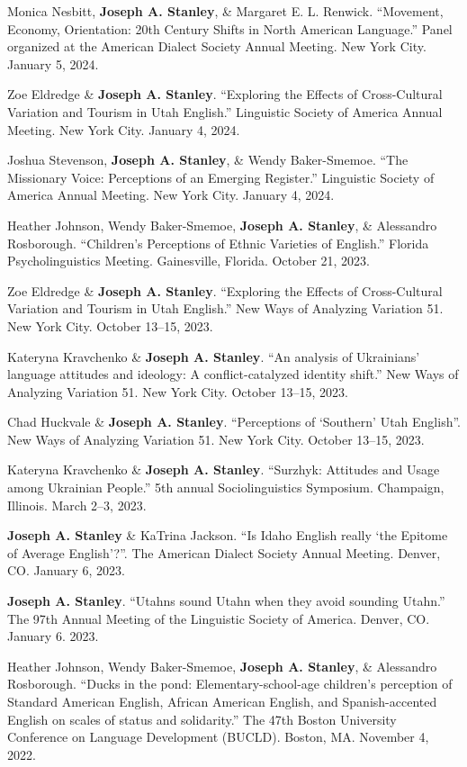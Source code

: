 \documentclass[
]{article}
\begin{document}
Monica Nesbitt, \textbf{Joseph A. Stanley}, \& Margaret E. L. Renwick.
``Movement, Economy, Orientation: 20th Century Shifts in North American
Language.'' Panel organized at the American Dialect Society Annual
Meeting. New York City. January 5, 2024.

{Zoe Eldredge} \& \textbf{Joseph A. Stanley}. ``Exploring the Effects of
Cross-Cultural Variation and Tourism in Utah English.'' Linguistic
Society of America Annual Meeting. New York City. January 4, 2024.

{Joshua Stevenson}, \textbf{Joseph A. Stanley}, \& Wendy Baker-Smemoe.
``The Missionary Voice: Perceptions of an Emerging Register.''
Linguistic Society of America Annual Meeting. New York City. January 4,
2024.

{Heather Johnson}, Wendy Baker-Smemoe, \textbf{Joseph A. Stanley}, \&
Alessandro Rosborough. ``Children's Perceptions of Ethnic Varieties of
English.'' Florida Psycholinguistics Meeting. Gainesville, Florida.
October 21, 2023.

{Zoe Eldredge} \& \textbf{Joseph A. Stanley}. ``Exploring the Effects of
Cross-Cultural Variation and Tourism in Utah English.'' New Ways of
Analyzing Variation 51. New York City. October 13--15, 2023.

{Kateryna Kravchenko} \& \textbf{Joseph A. Stanley}. ``An analysis of
Ukrainians' language attitudes and ideology: A conflict-catalyzed
identity shift.'' New Ways of Analyzing Variation 51. New York City.
October 13--15, 2023.

{Chad Huckvale} \& \textbf{Joseph A. Stanley}. ``Perceptions of
`Southern' Utah English''. New Ways of Analyzing Variation 51. New York
City. October 13--15, 2023.

{Kateryna Kravchenko} \& \textbf{Joseph A. Stanley}. ``Surzhyk:
Attitudes and Usage among Ukrainian People.'' 5th annual
Sociolinguistics Symposium. Champaign, Illinois. March 2--3, 2023.

\textbf{Joseph A. Stanley} \& {KaTrina Jackson}. ``Is Idaho English
really `the Epitome of Average English'?''. The American Dialect Society
Annual Meeting. Denver, CO. January 6, 2023.

\textbf{Joseph A. Stanley}. ``Utahns sound Utahn when they avoid
sounding Utahn.'' The 97th Annual Meeting of the Linguistic Society of
America. Denver, CO. January 6. 2023.

{Heather Johnson}, Wendy Baker-Smemoe, \textbf{Joseph A. Stanley}, \&
Alessandro Rosborough. ``Ducks in the pond: Elementary-school-age
children's perception of Standard American English, African American
English, and Spanish-accented English on scales of status and
solidarity.'' The 47th Boston University Conference on Language
Development (BUCLD). Boston, MA. November 4, 2022.
\end{document}
